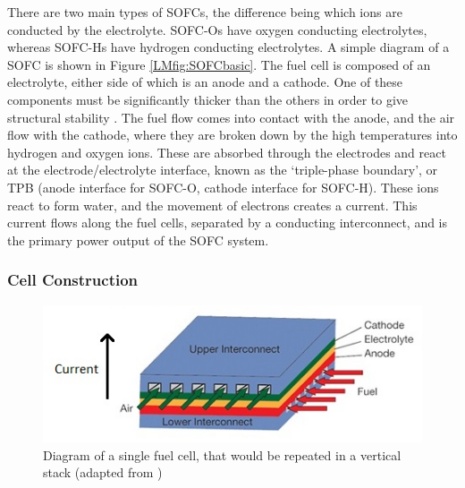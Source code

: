     
    There are two main types of SOFCs, the difference being which ions are conducted by the electrolyte. SOFC-Os have oxygen conducting electrolytes, whereas SOFC-Hs have hydrogen conducting electrolytes. 
A simple diagram of a SOFC is shown in Figure \ref{LMfig:SOFCbasic}. The fuel cell is composed of an electrolyte, either side of which is an anode and a cathode. One of these components must be significantly thicker than the others in order to give structural stability \cite{LM2}. The fuel flow comes into contact with the anode, and the air flow with the cathode, where they are broken down by the high temperatures into hydrogen and oxygen ions. These are absorbed through the electrodes and react at the electrode/electrolyte interface, known as the `triple-phase boundary', or TPB (anode interface for SOFC-O, cathode interface for SOFC-H). These ions react to form water, and the movement of electrons creates a current. This current flows along the fuel cells, separated by a conducting interconnect, and is the primary power output of the SOFC system.


    \subsubsection{Cell Construction}
    
    
     \begin{figure}[h]
        \centering
        \includegraphics[scale = 4]{fuelcelldiagramedit.jpg}
        \caption{Diagram of a single fuel cell, that would be repeated in a vertical stack (adapted from \cite{LM8})}
        \label{LMfig:SOFCconstruction}
    \end{figure}
    
